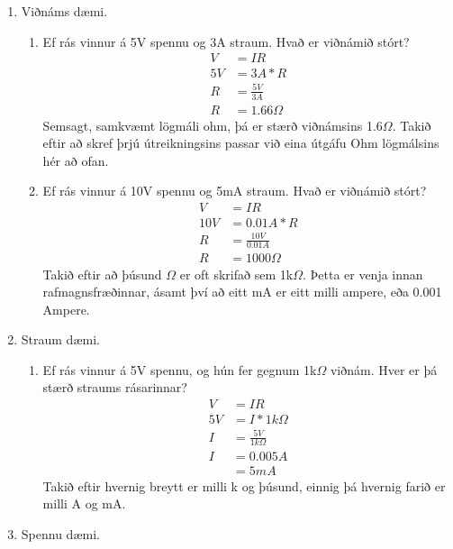 \begin{enumerate}
\item Viðnáms dæmi.
	\begin{enumerate}
	\item Ef rás vinnur á 5V spennu og 3A straum. Hvað er viðnámið stórt? \\
		\begin{equation}
			\begin{split}
			V&=IR \\
			5V&=3A*R \\
			R&=\frac{5V}{3A}\\
			R&=1.66\Omega
			\end{split}
		\end{equation}
		Semsagt, samkvæmt lögmáli ohm, þá er stærð viðnámsins 1.6$\Omega$. Takið eftir að skref þrjú útreikningsins passar við
		eina útgáfu Ohm lögmálsins hér að ofan.
	\item Ef rás vinnur á 10V spennu og 5mA straum. Hvað er viðnámið stórt?
		\begin{equation}
			\begin{split}
				V&=IR \\
				10V&=0.01A*R \\
				R&=\frac{10V}{0.01A} \\
				R&=1000\Omega
			\end{split}
		\end{equation}
		Takið eftir að þúsund $\Omega$ er oft skrifað sem 1k$\Omega$. Þetta er venja innan rafmagnsfræðinnar, ásamt því að eitt mA er eitt milli ampere, eða 0.001 Ampere.
	\end{enumerate}
\item Straum dæmi.
	\begin{enumerate}
	\item Ef rás vinnur á 5V spennu, og hún fer gegnum 1k$\Omega$ viðnám. Hver er þá stærð straums rásarinnar?
		\begin{equation}
			\begin{split}
			V&=IR \\
			5V&=I*1k\Omega \\
			I&=\frac{5V}{1k\Omega} \\
			I&=0.005A \\
			&=5mA
			\end{split}
		\end{equation}
		Takið eftir hvernig breytt er milli k og þúsund, einnig þá hvernig farið er milli A og mA.
	\end{enumerate}
\item Spennu dæmi.

\end{enumerate}
